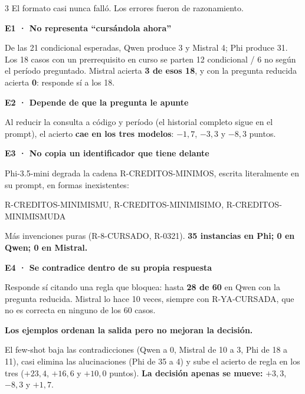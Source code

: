 \documentclass[9pt,a4paper,landscape]{extarticle}
\newcommand{\seccion}[1]{\vspace{1.0mm}{\bfseries\footnotesize\color{acento}\MakeUppercase{#1}}\par\nobreak\vspace{0.4mm}\nobreak}
\newcommand{\sub}[1]{{\bfseries #1}\par\nobreak\vspace{-1.3mm}\nobreak}
\newcommand{\cod}[1]{{\ttfamily\small #1}}
\newcommand{\destaque}[1]{%
  \begingroup\setlength{\fboxsep}{2.2mm}%
  \colorbox{fondo}{\parbox{\dimexpr\columnwidth-4.4mm\relax}{#1}}%
  \endgroup\par}
\begin{document}
\begin{multicols}{3}
\vspace{0.6mm}
El formato casi nunca falló. Los errores fueron de razonamiento.

\seccion{Diagnóstico de la falla}

\sub{E1 · No representa ``cursándola ahora''}
De las 21 \cod{condicional} esperadas, Qwen produce 3 y Mistral 4; Phi produce
31. Los 18 casos con un prerrequisito en curso se parten 12 \cod{condicional} /
6 \cod{no} según el período preguntado. Mistral acierta \textbf{3 de esos 18}, y
con la pregunta reducida acierta \textbf{0}: responde \cod{sí} a los 18.

\vspace{0.6mm}
\sub{E2 · Depende de que la pregunta le apunte}
Al reducir la consulta a código y período (el historial completo sigue en el
prompt), el acierto \textbf{cae en los tres modelos}: $-1{,}7$, $-3{,}3$ y
$-8{,}3$ puntos.

\vspace{0.6mm}
\sub{E3 · No copia un identificador que tiene delante}
Phi-3.5-mini degrada la cadena \cod{R-CREDITOS-MINIMOS}, escrita literalmente
en su prompt, en formas inexistentes:

\vspace{-1mm}
{\ttfamily\scriptsize R-CREDITOS-MINIMISMU, R-CREDITOS-MINIMISIMO,
R-CREDITOS-MINIMISMUDA}

\vspace{0.6mm}
Más invenciones puras (\cod{R-8-CURSADO}, \cod{R-0321}).
\textbf{35 instancias en Phi; 0 en Qwen; 0 en Mistral.}

\vspace{0.6mm}
\sub{E4 · Se contradice dentro de su propia respuesta}
Responde \cod{sí} citando una regla que bloquea: hasta \textbf{28 de 60} en
Qwen con la pregunta reducida. Mistral lo hace 10 veces, siempre con
\cod{R-YA-CURSADA}, que no es correcta en ninguno de los 60 casos.

\vspace{0.8mm}
\destaque{\footnotesize
\textbf{Los ejemplos ordenan la salida pero no mejoran la decisión.}\par\vspace{0.6mm}
El few-shot baja las contradicciones (Qwen a 0, Mistral de 10 a 3, Phi de 18 a
11), casi elimina las alucinaciones (Phi de 35 a 4) y sube el acierto de regla
en los tres ($+23{,}4$, $+16{,}6$ y $+10{,}0$ puntos). \textbf{La decisión
apenas se mueve:} $+3{,}3$, $-8{,}3$ y $+1{,}7$.}


\end{multicols}
\end{document}
